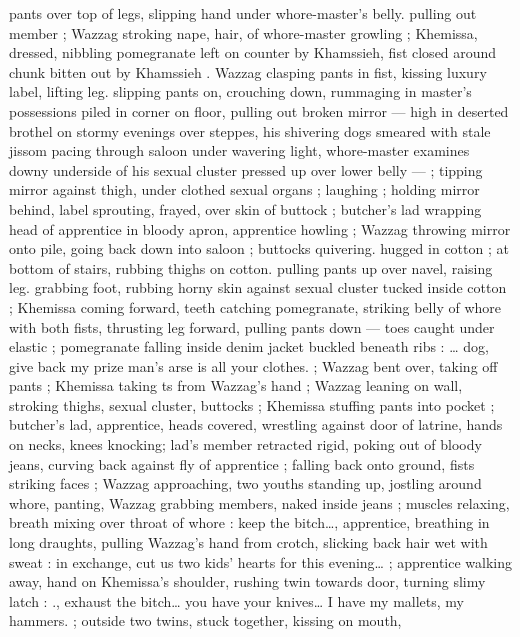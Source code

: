 pants over top of legs, slipping hand under whore-master's belly. 
pulling out member ; Wazzag stroking nape, hair, of whore-master 
growling ; Khemissa, dressed, nibbling pomegranate left on counter 
by Khamssieh, fist closed around chunk bitten out by Khamssieh . 
Wazzag clasping pants in fist, kissing luxury label, lifting leg. slipping 
pants on, crouching down, rummaging in master's possessions piled 
in corner on floor, pulling out broken mirror --- high in deserted 
brothel on stormy evenings over steppes, his shivering dogs 
smeared with stale jissom pacing through saloon under wavering 
light, whore-master examines downy underside of his sexual cluster 
pressed up over lower belly --- ; tipping mirror against thigh, under 
clothed sexual organs ; laughing ; holding mirror behind, label 
sprouting, frayed, over skin of buttock ; butcher's lad wrapping head 
of apprentice in bloody apron, apprentice howling ; Wazzag throwing 
mirror onto pile, going back down into saloon ; buttocks quivering. 
hugged in cotton ; at bottom of stairs, rubbing thighs on cotton. 
pulling pants up over navel, raising leg. grabbing foot, rubbing horny 
skin against sexual cluster tucked inside cotton ; Khemissa coming 
forward, teeth catching pomegranate, striking belly of whore with 
both fists, thrusting leg forward, pulling pants down --- toes caught 
under elastic ; pomegranate falling inside denim jacket buckled 
beneath ribs : {\gl}{\ldots} dog, give back my prize{\td} man's arse is all your 
clothes.{\gr} ; Wazzag bent over, taking off pants ; Khemissa taking 
ts from Wazzag's hand ; Wazzag leaning on wall, stroking thighs, 
sexual cluster, buttocks ; Khemissa stuffing pants into pocket ; 
butcher's lad, apprentice, heads covered, wrestling against door of 
latrine, hands on necks, knees knocking; lad's member retracted 
rigid, poking out of bloody jeans, curving back against fly of 
apprentice ; falling back onto ground, fists striking faces ; Wazzag 
approaching, two youths standing up, jostling around whore, panting, 
Wazzag grabbing members, naked inside jeans ; muscles relaxing, 
breath mixing over throat of whore : {\gl} keep the bitch{\ldots}{\gr}, apprentice, 
breathing in long draughts, pulling Wazzag's hand from crotch, 
slicking back hair wet with sweat : {\gl}{\td} in exchange, cut us two kids' 
hearts for this evening{\ldots}{\gr} ; apprentice walking away, hand on 
Khemissa's shoulder, rushing twin towards door, turning slimy latch : 
{\gl}., exhaust the bitch{\ldots} you have your knives{\ldots} I have my mallets, my 
hammers.{\gr} ; outside {\td} two twins, stuck together, kissing on mouth, 
